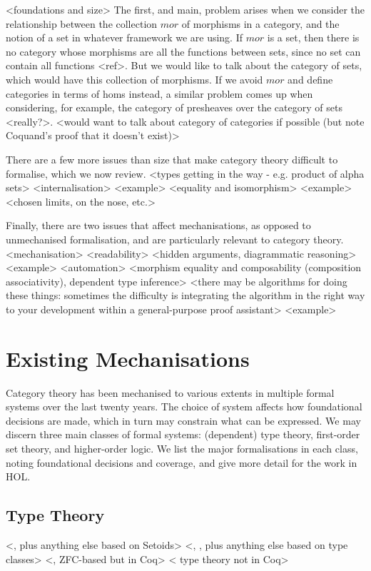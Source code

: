 \documentclass[twoside,titlepage,11pt]{article}
\begin{document}
<foundations and size>%
The first, and main, problem arises when we consider the relationship between the collection $mor$ of morphisms in a category, and the notion of a set in whatever framework we are using.
If $mor$ is a set, then there is no category whose morphisms are all the functions between sets, since no set can contain all functions <ref>.
But we would like to talk about the category of sets, which would have this collection of morphisms.
If we avoid $mor$ and define categories in terms of homs instead, a similar problem comes up when considering, for example, the category of presheaves over the category of sets <really?>.
<would want to talk about category of categories if possible (but note Coquand's proof that it doesn't exist)>

There are a few more issues than size that make category theory difficult to formalise, which we now review.
<types getting in the way - e.g. product of alpha sets>
<internalisation>%
  <example>
<equality and isomorphism>%
  <example>
  <chosen limits, on the nose, etc.>

Finally, there are two issues that affect mechanisations, as opposed to unmechanised formalisation, and are particularly relevant to category theory.
<mechanisation>
  <readability>%
    <hidden arguments, diagrammatic reasoning>
    <example>
  <automation>%
    <morphism equality and composability (composition associativity), dependent type inference> 
    <there may be algorithms for doing these things: sometimes the difficulty is integrating the algorithm in the right way to your development within a general-purpose proof assistant>
    <example>
\section{Existing Mechanisations}\label{sec:existing}%
Category theory has been mechanised to various extents in multiple formal systems over the last twenty years.
The choice of system affects how foundational decisions are made, which in turn may constrain what can be expressed.
We may discern three main classes of formal systems: (dependent) type theory, first-order set theory, and higher-order logic.
We list the major formalisations in each class, noting foundational decisions and coverage, and give more detail for the work in HOL.%
\subsection{Type Theory}%
  <\cite{DBLP:conf/birthday/HuetS00}, plus anything else based on Setoids>%
  <\cite{Megacz}, \cite{Sozeau}, plus anything else based on type classes>%
  <\cite{Simpson04}, ZFC-based but in Coq>%
  <\cite{weber02program,Wilander,DBLP:conf/cade/KozenKR06} type theory not in Coq>%
\end{document}
